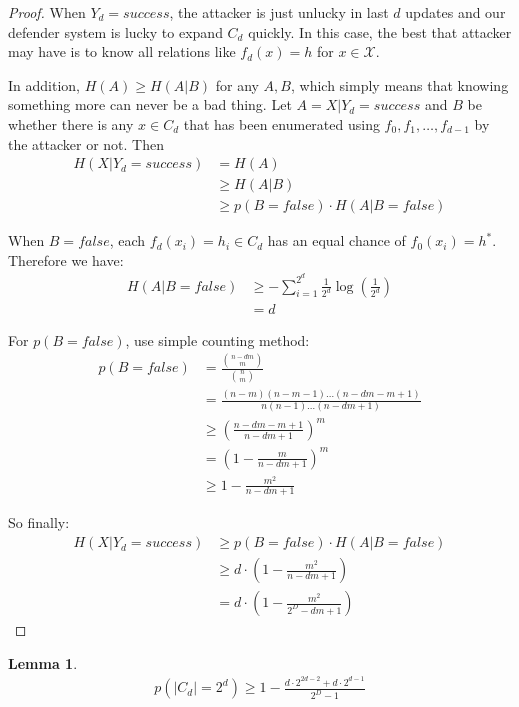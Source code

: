 \documentclass[10pt,a4paper]{article}
\newtheorem{mylemma}{Lemma}
\begin{document}
		\begin{proof}
			When $Y_d = success$, the attacker
			is just unlucky in last $d$ updates
			and our defender system is lucky
			to expand $C_d$ quickly.
			In this case, the best that attacker
			may have is to know all relations
			like $f_d(x) = h$ for $x \in \mathcal X$.
			
			In addition, $H(A) \geq H(A|B)$ for
			any $A, B$, which simply means that knowing something
			more can never be a bad thing. Let $A = X | Y_d = success$
			and $B$ be whether there is any $x \in C_d$ that
			has been enumerated using $f_0, f_1, \ldots, f_{d-1}$ 
			by the attacker or not.
			Then
			\begin{align*}
				H(X | Y_d = success) &= H(A)\\
					&\geq H(A | B)\\
					&\geq p(B = false) \cdot H(A | B = false)
			\end{align*}
			
			When $B = false$, each $f_d(x_i) = h_i \in C_d$
			has an equal chance of $f_0(x_i) = h^*$. Therefore
			we have:
			\begin{align*}
				H(A | B = false) &\geq -\sum_{i = 1}^{2^d} \frac{1}{2^d} \log(\frac{1}{2^d})\\
					&= d
			\end{align*}
			
			For $p(B = false)$, use simple counting method:
			\begin{align*}
				p(B = false) &= \frac{\binom{n-dm}{m}}{\binom{n}{m}}\\
					&= \frac{(n-m)(n-m-1)\ldots(n-dm-m+1)}{n(n-1)\ldots(n-dm+1)}\\
					&\geq (\frac{n-dm-m+1}{n-dm+1})^m\\
					&= (1-\frac{m}{n-dm+1})^m\\
					&\geq 1-\frac{m^2}{n-dm+1}
			\end{align*}
			
			So finally:
			\begin{align*}
				H(X | Y_d = success) &\geq p(B = false) \cdot H(A | B = false)\\
					&\geq d \cdot (1-\frac{m^2}{n-dm+1})\\
					&= d \cdot (1-\frac{m^2}{2^D-dm+1})
			\end{align*}
		\end{proof}
		
		\begin{mylemma}
			\begin{align*}
				p(|C_d| = 2^d) \geq 1-\frac{d \cdot 2^{2d-2}+d \cdot 2^{d-1}}{2^D-1}
			\end{align*}
		\end{mylemma}
		
\end{document}

